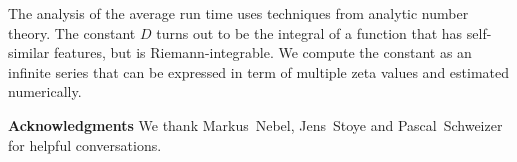   The analysis of the average run time uses 
  techniques from analytic number theory. %
  The constant $D$ turns out to be the integral of
  a function that has
  self-similar features, but is
  Riemann-integrable. We compute the constant as an infinite series that
  can be expressed in term of multiple zeta values and estimated
  numerically.
  
  \medskip

  \textbf{Acknowledgments} 
  We thank Markus~Nebel,  Jens~Stoye and Pascal~Schweizer for helpful
  conversations.

  
